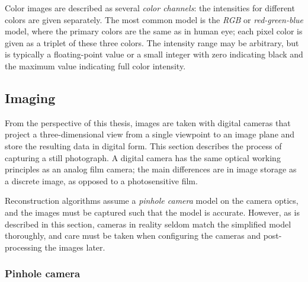Color images are described as several \emph{color channels}: the intensities for different colors are given separately.
The most common model is the \emph{RGB} or \emph{red-green-blue} model, where the primary colors are the same as in human eye; each pixel color is given as a triplet of these three colors.
The intensity range may be arbitrary, but is typically a floating-point value or a small integer with zero indicating black and the maximum value indicating full color intensity.
\cite{pitas2000digital}


\subsection{Imaging} \label{sec:imaging} %

From the perspective of this thesis, images are taken with digital cameras that project a three-dimensional view from a single viewpoint to an image plane and store the resulting data in digital form.
This section describes the process of capturing a still photograph.
A digital camera has the same optical working principles as an analog film camera;
the main differences are in image storage as a discrete image, as opposed to a photosensitive film.

Reconstruction algorithms assume a \emph{pinhole camera} model on the camera optics, and the images must be captured such that the model is accurate.
However, as is described in this section, cameras in reality seldom match the simplified model thoroughly, and care must be taken when configuring the cameras and post-processing the images later.


\subsubsection{Pinhole camera} \label{sec:pinhole} %




